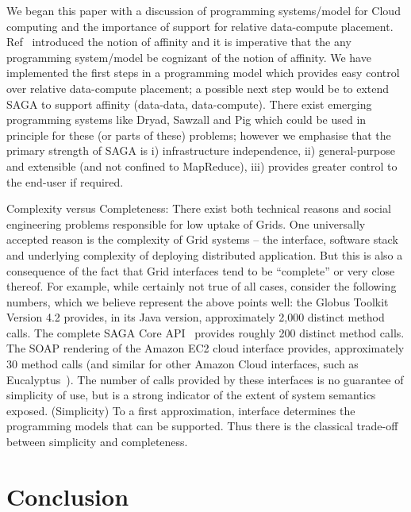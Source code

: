 \documentclass[conference,final]{IEEEtran}
\begin{document}
We began this paper with a discussion of programming systems/model for
Cloud computing and the importance of support for relative
data-compute placement. Ref~\cite{jha_ccpe09} introduced the notion of
affinity and it is imperative that the any programming system/model be
cognizant of the notion of affinity. We have implemented the first
steps in a programming model which provides easy control over relative
data-compute placement; a possible next step would be to extend SAGA
to support affinity (data-data, data-compute).  There exist emerging
programming systems like Dryad, Sawzall and Pig which could be used in
principle for these (or parts of these) problems; however we emphasise
that the primary strength of SAGA is i) infrastructure independence,
ii) general-purpose and extensible (and not confined to MapReduce),
iii) provides greater control to the end-user if required.

Complexity versus Completeness: There exist both technical reasons and
social engineering problems responsible for low uptake of Grids. One
universally accepted reason is the complexity of Grid systems -- the
interface, software stack and underlying complexity of deploying
distributed application. But this is also a consequence of the fact
that Grid interfaces tend to be ``complete'' or very close thereof.
For example, while certainly not true of all cases, consider the
following numbers, which we believe represent the above points well:
the Globus Toolkit Version 4.2 provides, in its Java version,
approximately 2,000 distinct method calls.  The complete SAGA Core
API~\cite{saga-core} provides roughly 200 distinct method calls.  The
SOAP rendering of the Amazon EC2 cloud interface provides,
approximately 30 method calls (and similar for other Amazon Cloud
interfaces, such as Eucalyptus~\cite{eucalyptus_url}).  The number of
calls provided by these interfaces is no guarantee of simplicity of
use, but is a strong indicator of the extent of system semantics
exposed.  (Simplicity) To a first approximation, interface determines
the programming models that can be supported. Thus there is the
classical trade-off between simplicity and completeness.

\section{Conclusion}

\end{document}
